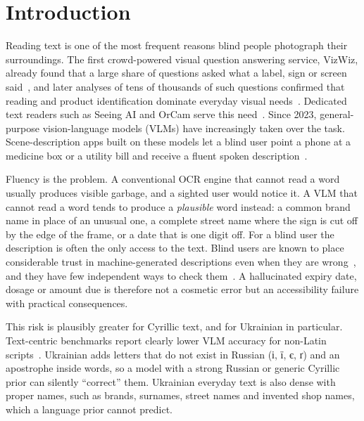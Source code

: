 \documentclass[pdflatex,sn-mathphys-num]{sn-jnl}%
\theoremstyle{thmstyleone}%
\theoremstyle{thmstyletwo}%
\theoremstyle{thmstylethree}%
\begin{document}

\maketitle


\section{Introduction}\label{sec:intro}

Reading text is one of the most frequent reasons blind people photograph their surroundings. The first crowd-powered visual question answering service, VizWiz, already found that a large share of questions asked what a label, sign or screen said~\cite{bigham2010vizwiz}, and later analyses of tens of thousands of such questions confirmed that reading and product identification dominate everyday visual needs~\cite{brady2013visual,gurari2018vizwiz}. Dedicated text readers such as Seeing AI and OrCam serve this need~\cite{granquist2021evaluation,khan2020insight}. Since 2023, general-purpose vision-language models (VLMs) have increasingly taken over the task. Scene-description apps built on these models let a blind user point a phone at a medicine box or a utility bill and receive a fluent spoken description~\cite{gonzalezpenuela2024investigating,xie2025beyond,adnin2024king}.

Fluency is the problem. A conventional OCR engine that cannot read a word usually produces visible garbage, and a sighted user would notice it. A VLM that cannot read a word tends to produce a \emph{plausible} word instead: a common brand name in place of an unusual one, a complete street name where the sign is cut off by the edge of the frame, or a date that is one digit off. For a blind user the description is often the only access to the text. Blind users are known to place considerable trust in machine-generated descriptions even when they are wrong~\cite{macleod2017understanding}, and they have few independent ways to check them~\cite{alharbi2024misfitting,hong2024understanding}. A hallucinated expiry date, dosage or amount due is therefore not a cosmetic error but an accessibility failure with practical consequences.

This risk is plausibly greater for Cyrillic text, and for Ukrainian in particular. Text-centric benchmarks report clearly lower VLM accuracy for non-Latin scripts~\cite{liu2024ocrbench,tang2025mtvqa}. Ukrainian adds letters that do not exist in Russian (\foreignlanguage{ukrainian}{і, ї, є, ґ}) and an apostrophe inside words, so a model with a strong Russian or generic Cyrillic prior can silently ``correct'' them. Ukrainian everyday text is also dense with proper names, such as brands, surnames, street names and invented shop names, which a language prior cannot predict.
\end{document}
